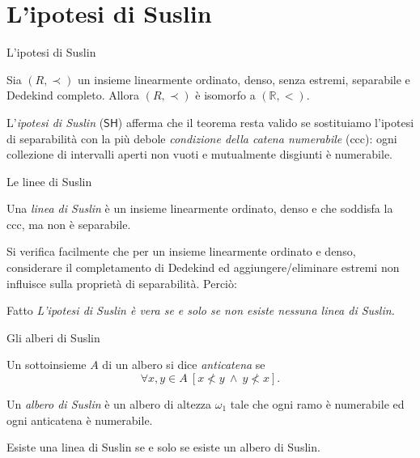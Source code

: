 \documentclass{beamer}
\theoremstyle{num.custom-title}
\theoremstyle{custom-title}
\newcommand{\SH}{\ensuremath{\mathsf{SH}}\xspace}
\newcommand{\R}{\mathbb{R}}
\begin{document}
\section{L'ipotesi di Suslin}


\begin{frame}{L'ipotesi di Suslin}

\begin{theorem}[Cantor, 1895]
Sia $(R,\prec)$ un insieme linearmente ordinato, denso, senza estremi, separabile e Dedekind completo. Allora $(R,\prec)$ è isomorfo a $(\R,<)$.
\end{theorem}

\pause

L'\emph{ipotesi di Suslin} (\SH) afferma che il teorema resta valido se sostituiamo l'ipotesi di separabilità con la più debole \emph{condizione della catena numerabile} (ccc): ogni collezione di intervalli aperti non vuoti e mutualmente disgiunti è numerabile.

\end{frame}


\begin{frame}{Le linee di Suslin}

\begin{definition}
Una \emph{linea di Suslin} è un insieme linearmente ordinato, denso e che soddisfa la ccc, ma non è separabile.
\end{definition}

\pause

Si verifica facilmente che per un insieme linearmente ordinato e denso, considerare il completamento di Dedekind ed aggiungere/eliminare estremi non influisce sulla proprietà di separabilità. Perciò:

\pause

\begin{block}{Fatto}
\textit{L'ipotesi di Suslin è vera se e solo se non esiste nessuna linea di Suslin.}
\end{block}

\end{frame}


\begin{frame}{Gli alberi di Suslin}

\begin{definition}
Un sottoinsieme $A$ di un albero si dice \emph{anticatena} se 
\[
\forall x,y \in A \ [x \nless y \ \wedge \ y \nless x].
\]
\end{definition}

\pause

\begin{definition}
Un \emph{albero di Suslin} è un albero di altezza $\omega_1$ tale che ogni ramo è numerabile ed ogni anticatena è numerabile.
\end{definition}

\pause

\begin{theorem}[Kurepa, 1935]
Esiste una linea di Suslin se e solo se esiste un albero di Suslin.
\end{theorem}

\end{frame}
\end{document}
